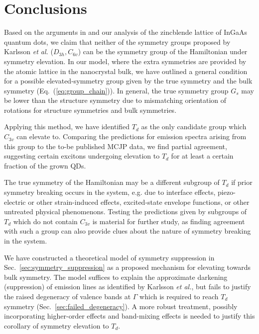 \chapter{Conclusions} \label{sec:conclusions}

Based on the arguments in \cite{bulk_limiting} and our analysis of the zincblende lattice of InGaAs quantum dots, we claim that neither of the symmetry groups proposed by Karlsson \textit{et al.} ($D_{3h}, C_{6v}$) can be the symmetry group of the Hamiltonian under symmetry elevation. In our model, where the extra symmetries are provided by the atomic lattice in the nanocrystal bulk, we have outlined a general condition for a possible elevated-symmetry group given by the true symmetry and the bulk symmetry (Eq.~(\ref{eq:group_chain})). In general, the true symmetry group $G_s$ may be lower than the structure symmetry due to mismatching orientation of rotations for structure symmetries and bulk symmetries.

Applying this method, we have identified $T_d$ as the only candidate group which $C_{3v}$ can elevate to. Comparing the predictions for emission spectra arising from this group to the to-be published MCJP data, we find partial agreement, suggesting certain excitons undergoing elevation to $T_d$ for at least a certain fraction of the grown QDs.

The true symmetry of the Hamiltonian may be a different subgroup of $T_d$ if prior symmetry breaking occurs in the system, e.g. due to interface effects, piezo-electric or other strain-induced effects, excited-state envelope functions, or other untreated physical phenomenons. Testing the predictions given by subgroups of $T_d$ which do not contain $C_{3v}$ is material for further study, as finding agreement with such a group can also provide clues about the nature of symmetry breaking in the system.

We have constructed a theoretical model of symmetry suppression in Sec.~\ref{sec:symmetry_suppression} as a proposed mechanism for elevating towards bulk symmetry. The model suffices to explain the approximate darkening (suppression) of emission lines as identified by Karlsson \textit{et al.}, but fails to justify the raised degeneracy of valence bands at $\Gamma$ which is required to reach $T_d$ symmetry (Sec.~\ref{sec:failed_degeneracy}). A more robust treatment, possibly incorporating higher-order effects and band-mixing effects is needed to justify this corollary of symmetry elevation to $T_d$.

